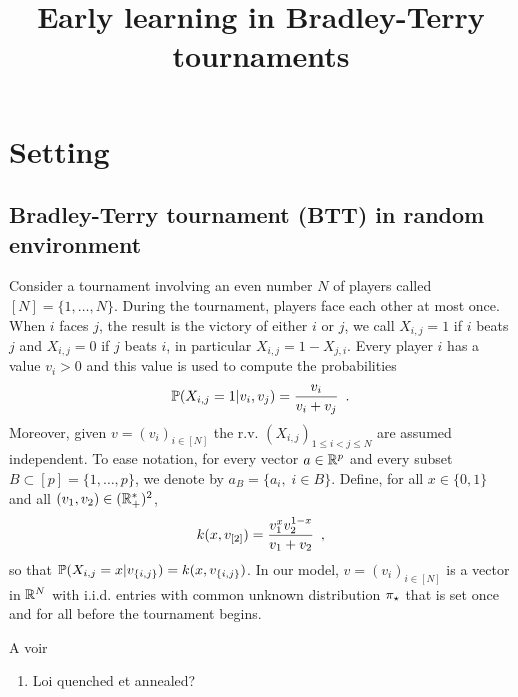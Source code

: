 


\title{Early learning in Bradley-Terry tournaments}
\date{}

\author{}

\lhead{}

\maketitle

\begin{abstract}

\end{abstract}
\section{Setting}
\subsection{Bradley-Terry tournament (BTT) in random environment}
Consider a tournament involving an even number $N$ of players called $[N]=\{1,\ldots,N\}$. During the tournament, players face each other at most once. When $i$ faces $j$, the result is the victory of either $i$ or $j$, we call $X_{i,j}=1$ if $i$ beats $j$ and $X_{i,j}=0$ if $j$ beats $i$, in particular $X_{i,j}=1-X_{j,i}$. Every player $i$ has a value $v_i>0$ and this value is used to compute the probabilities
\[
\mathbb{P}(X_{i,j}=1|v_i,v_j)=\frac{v_i}{v_i+v_j}\enspace.
\]
Moreover, given $v=(v_i)_{i\in[N]}$ the r.v. $(X_{i,j})_{1\le i<j\le N}$ are assumed independent. To ease notation, for every vector $a\in \mathbb{R}^p$ and every subset $B\subset [p]=\{1,\ldots,p\}$, we denote by $a_{B}=\{a_i,\;i\in B\}$. Define, for all $x\in \{0,1\}$ and all $(v_1,v_2)\in(\mathbb{R}_+^*)^2$, 
\[
k(x,v_{[2]})=\frac{v_1^xv_2^{1-x}}{v_1+v_2}\enspace,
\]
so that $\mathbb{P}(X_{i,j}=x|v_{\{i,j\}})=k(x,v_{\{i,j\}})$. In our model, $v=(v_i)_{i\in [N]}$ is a vector in $\mathbb{R}^N$ with i.i.d. entries with common unknown distribution $\pi_{\star}$ that is set once and for all before the tournament begins. 

A voir
\begin{enumerate}
 \item Loi quenched et annealed?
\end{enumerate}

